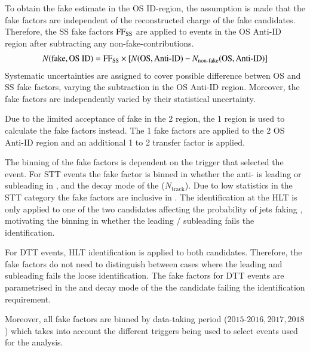 To obtain the fake \tauhadvis estimate in the OS ID-region, the assumption is
made that the fake factors are independent of the reconstructed charge of the
fake \tauhadvis candidates. Therefore, the SS fake factors $\text{FF}_\text{SS}$ are
applied to events in the OS Anti-ID region after subtracting any
non-fake-\tauhadvis contributions.
\begin{align*}
  N(\text{fake}, \text{OS ID}) = \text{FF}_\text{SS} \times \left[ N(\text{OS}, \text{Anti-ID}) - N_\text{non-fake}(\text{OS}, \text{Anti-ID}) \right]
\end{align*}
Systematic uncertainties are assigned to
cover possible difference betwen OS and SS fake factors, varying the
subtraction in the OS Anti-ID region. Moreover, the fake factors are
independently varied by their statistical uncertainty.

Due to the limited acceptance of fake \tauhadvis in the 2 \btag region, the 1
\btag region is used to calculate the fake factors instead. The 1 \btag fake
factors are applied to the 2 \btag OS Anti-ID region and an additional 1 to 2
\btag transfer factor is applied.

The binning of the fake factors is dependent on the trigger that selected the
event. For STT events the fake factor is binned in whether the anti-\tauhadvis
is leading or subleading in \pT, and the decay mode of the \tauhadvis
($N_\text{track}$). Due to low statistics in the STT category the fake factors
are inclusive in \tauhadvis \pT. The \tauhadvis identification at the HLT is
only applied to one of the two \tauhadvis candidates affecting the probability
of jets faking \tauhadvis, motivating the binning in whether the leading /
subleading \tauhadvis fails the identification.

For DTT events, HLT \tauhadvis identification is applied to both \tauhadvis
candidates. Therefore, the fake factors do not need to distinguish between cases
where the leading and subleading \tauhadvis fails the loose identification. The
fake factors for DTT events are parametrised in the \pT and decay mode of the
the \tauhadvis candidate failing the identification requirement.

Moreover, all fake factors are binned by data-taking period (${\text{2015-2016},
  \text{2017}, \text{2018}}$) which takes into account the different triggers
being used to select events used for the analysis.











